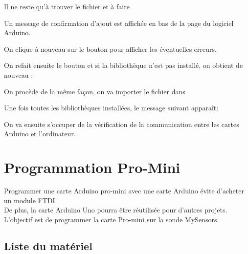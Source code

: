 Il ne reste qu'à trouver le fichier  et à faire 


Un message de confirmation d'ajout est affichée en bas de la page du logiciel Arduino.


On clique à nouveau sur le bouton  pour afficher les éventuelles erreurs.

 

On refait ensuite le bouton  et si la bibliothèque  n'est pas installé, on obtient de nouveau : 


On procède de la même façon, on va importer le fichier  dans 

Une fois toutes les bibliothèques installées, le message suivant apparaît: 


On va ensuite s'occuper de la vérification de la communication entre les cartes Arduino et l'ordinateur.\chapter{Programmation Pro-Mini}

Programmer une carte Arduino pro-mini avec une carte Arduino évite d'acheter un module FTDI.\\
De plus, la carte Arduino Uno pourra être réutilisée pour d'autres projets.\\

L'objectif est de programmer la carte Pro-mini sur la sonde MySensors.

\section{Liste du matériel}

